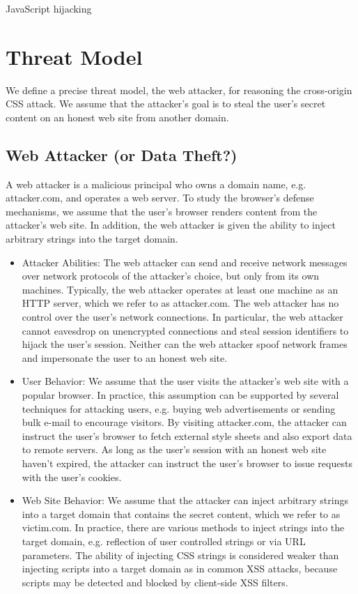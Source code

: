 \documentclass{acm_proc_article-sp}
\begin{document}
JavaScript hijacking\cite{jshijacking}

\section{Threat Model}
We define a precise threat model, the web attacker, for reasoning the cross-origin CSS attack. We assume that the attacker's goal is to steal the user's secret content on an honest web site from another domain.

\subsection{Web Attacker (or Data Theft?)}
A web attacker is a malicious principal who owns a domain name, e.g. attacker.com, and operates a web server. To study the browser's defense mechanisms, we assume that the user's browser renders content from the attacker's web site. In addition, the web attacker is given the ability to inject arbitrary strings into the target domain.

\begin{itemize}

\item{Attacker Abilities:}
The web attacker can send and receive network messages over network protocols of the attacker's choice, but only from its own machines. Typically, the web attacker operates at least one machine as an HTTP server, which we refer to as attacker.com. The web attacker has no control over the user's network connections. In particular, the web attacker cannot eavesdrop on unencrypted connections and steal session identifiers to hijack the user's session. Neither can the web attacker spoof network frames and impersonate the user to an honest web site.

\item{User Behavior:}
We assume that the user visits the attacker's web site with a popular browser. In practice, this assumption can be supported by several techniques for attacking users, e.g. buying web advertisements or sending bulk e-mail to encourage visitors. By visiting attacker.com, the attacker can instruct the user's browser to fetch external style sheets and also export data to remote servers. As long as the user's session with an honest web site haven't expired, the attacker can instruct the user's browser to issue requests with the user's cookies.

\item{Web Site Behavior:}
We assume that the attacker can inject arbitrary strings into a target domain that contains the secret content, which we refer to as victim.com. In practice, there are various methods to inject strings into the target domain, e.g. reflection of user controlled strings or via URL parameters. The ability of injecting CSS strings is considered weaker than injecting scripts into a target domain as in common XSS attacks, because scripts may be detected and blocked by client-side XSS filters.

\end{itemize}
\end{document}

